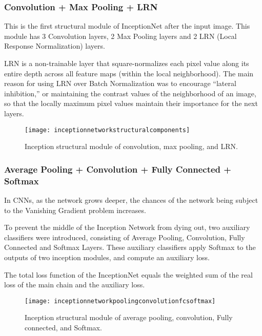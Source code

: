 	\subsubsection{Convolution + Max Pooling + LRN}
	\begin{bulletedlist}
		\item This is the first structural module of InceptionNet after the input image. This module has 3 Convolution layers, 2 Max Pooling layers and 2 LRN (Local Response Normalization) layers.
		\item LRN is a non-trainable layer that square-normalizes each pixel value along its entire depth across all feature maps (within the local neighborhood). The main reason for using LRN over Batch Normalization was to encourage ``lateral inhibition,'' or maintaining the contrast values of the neighborhood of an image, so that the locally maximum pixel values maintain their importance for the next layers.
	\end{bulletedlist}

	\begin{figure}[tbh]
		\centering
		\texttt{[image: inceptionnetworkstructuralcomponents]}
		\caption[Inception structural module of convolution, max pooling, and LRN]{Inception structural module of convolution, max pooling, and LRN.}
		\label{fig:inceptionnetworkstructuralcomponents}
	\end{figure}

	\subsubsection{Average Pooling + Convolution + Fully Connected + Softmax}	
	\begin{bulletedlist}
		\item In CNNs, as the network grows deeper, the chances of the network being subject to the Vanishing Gradient problem increases.
		\item To prevent the middle of the Inception Network from dying out, two auxiliary classifiers were introduced, consisting of Average Pooling, Convolution, Fully Connected and Softmax Layers.  These auxiliary classifiers apply Softmax to the outputs of two inception modules, and compute an auxiliary loss.
		\item The total loss function of the InceptionNet equals the weighted sum of the real loss of the main chain and the auxiliary loss.
	\end{bulletedlist}

	\begin{figure}[tbh]
		\centering
		\texttt{[image: inceptionnetworkpoolingconvolutionfcsoftmax]}
		\caption[Inception structural module of average pooling, convolution, FC, and Softmax]{Inception structural module of average pooling, convolution, Fully connected, and Softmax.}
		\label{fig:inceptionnetworkpoolingconvolutionfcsoftmax}
	\end{figure}


